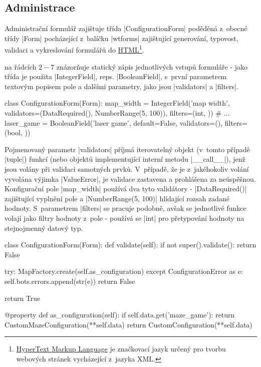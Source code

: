 \subsection{Administrace}
\label{subsec:administration}

\begin{sloppypar}
    Administrační formulář zajištuje třída \ic|ConfigurationForm| poděděná z~obecné třídy \ic|Form| pocházející z~balíčku \ic|wtforms| zajištující generování, typovost, validaci a vykreslování formulářů do \href{https://cs.wikipedia.org/wiki/HyperText_Markup_Language}{HTML}\footnote{\href{https://cs.wikipedia.org/wiki/HyperText_Markup_Language}{HyperText Markup Language} je značkovací jazyk určený pro tvorbu webových stránek vycházející z~jazyka XML.}.

     na řádcích $2-7$ znázorňuje statický zápis jednotlivých vstupů formuláře - jako třída je použita \ic|IntegerField|, reps. \ic|BooleanField|, s~první parametrem textovým popisem pole a dalšími parametry, jako jsou \ic|validators| a \ic|filters|.
\end{sloppypar}

\begin{code}[caption={Ukázka deklarace polí konfiguračního formuláře},label={lst:conf-form-fields}]
class ConfigurationForm(Form):
    map_width = IntegerField('map width',
        validators=(DataRequired(), NumberRange(5, 100)),
        filters=(int, ))
    # ...
    laser_game = BooleanField('laser game',
        default=False, validators=(),
        filters=(bool, ))
\end{code}

\begin{sloppypar}
    Pojmenovaný parametr \ic|validators| příjmá iterovatelný objekt (v~tomto případě \ic|tuple|) funkcí (nebo objektů implementující interní metodu \ic|__call__|), jenž jsou volány při validaci samotných prvků. V~případě, že je z~jakéhokoliv volání vyvolána výjimka \ic|ValueError|, je validace zastavena a prohlášena za neúspěšnou. Konfigurační pole \ic|map_width| používá dva tyto validátory - \ic|DataRequired()| zajištující vyplnění pole a \ic|NumberRange(5, 100)| hlídající rozsah zadané hodnoty. S~parametrem \ic|filters| se pracuje podobně, avšak se jednotlivé funkce volají jako filtry hodnoty z~pole - používá se \ic|int| pro přetypování hodnoty na stejnojmenný datový typ.
\end{sloppypar}

\begin{code}[caption={Implementace vlastních metod v~$ConfigurationForm$},label={lst:conf-form-methods}]
class ConfigurationForm(Form):
    def validate(self):
        if not super().validate():
            return False

        try:
            MapFactory.create(self.as_configuration)
        except ConfigurationError as e:
            self.bots.errors.append(str(e))
            return False

        return True

    @property
    def as_configuration(self):
        if self.data.get('maze_game'):
            return CustomMazeConfiguration(**self.data)
        return CustomConfiguration(**self.data)
\end{code}

